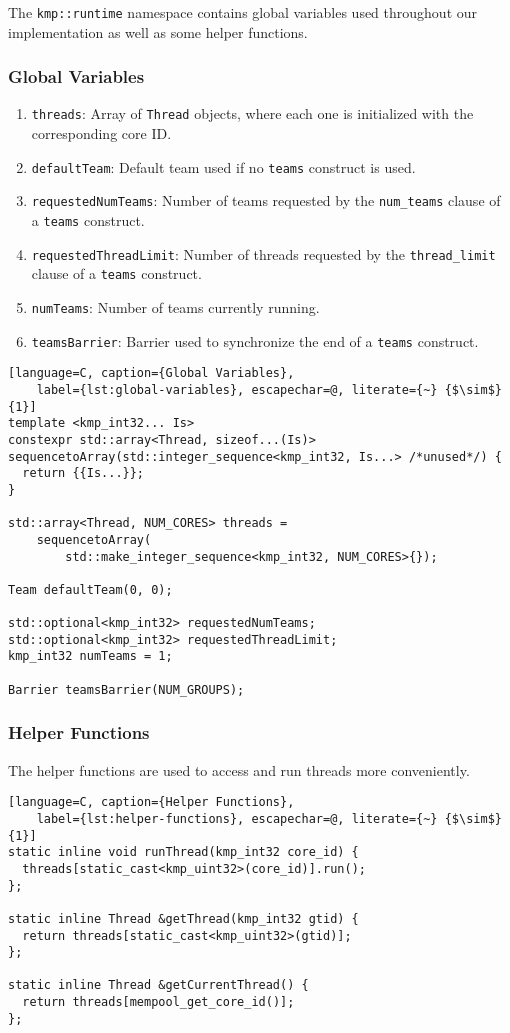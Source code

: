 The \texttt{kmp::runtime} namespace contains global variables used throughout our implementation as
well as some helper functions.

\subsubsection{Global Variables}

\begin{enumerate}
	\item \texttt{threads}: Array of \texttt{Thread} objects, where each one is initialized with the
	      corresponding core ID.
	\item \texttt{defaultTeam}: Default team used if no \texttt{teams} construct is used.
	\item \texttt{requestedNumTeams}: Number of teams requested by the \texttt{num\_teams} clause
	      of a \texttt{teams} construct.
	\item \texttt{requestedThreadLimit}: Number of threads requested by the \texttt{thread\_limit}
	      clause of a \texttt{teams} construct.
	\item \texttt{numTeams}: Number of teams currently running.
	\item \texttt{teamsBarrier}: Barrier used to synchronize the end of a \texttt{teams} construct.
\end{enumerate}

\begin{lstlisting}[language=C, caption={Global Variables},
	label={lst:global-variables}, escapechar=@, literate={~} {$\sim$}{1}]
template <kmp_int32... Is>
constexpr std::array<Thread, sizeof...(Is)>
sequencetoArray(std::integer_sequence<kmp_int32, Is...> /*unused*/) {
  return {{Is...}};
}

std::array<Thread, NUM_CORES> threads =
    sequencetoArray(
        std::make_integer_sequence<kmp_int32, NUM_CORES>{});

Team defaultTeam(0, 0);

std::optional<kmp_int32> requestedNumTeams;
std::optional<kmp_int32> requestedThreadLimit;
kmp_int32 numTeams = 1;

Barrier teamsBarrier(NUM_GROUPS);
\end{lstlisting}

\subsubsection{Helper Functions}

The helper functions are used to access and run threads more conveniently.

\begin{lstlisting}[language=C, caption={Helper Functions},
	label={lst:helper-functions}, escapechar=@, literate={~} {$\sim$}{1}]
static inline void runThread(kmp_int32 core_id) {
  threads[static_cast<kmp_uint32>(core_id)].run();
};

static inline Thread &getThread(kmp_int32 gtid) {
  return threads[static_cast<kmp_uint32>(gtid)];
};

static inline Thread &getCurrentThread() {
  return threads[mempool_get_core_id()];
};
\end{lstlisting}
